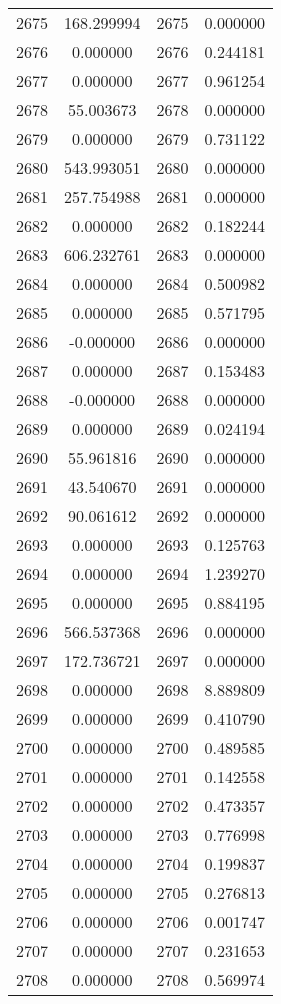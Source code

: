 \documentclass[12pt]{article}
\begin{document}
\begin{longtable}{@{}cccc@{}}
2675 & 168.299994 & 2675 & 0.000000 \\
2676 & 0.000000 & 2676 & 0.244181 \\
2677 & 0.000000 & 2677 & 0.961254 \\
2678 & 55.003673 & 2678 & 0.000000 \\
2679 & 0.000000 & 2679 & 0.731122 \\
2680 & 543.993051 & 2680 & 0.000000 \\
2681 & 257.754988 & 2681 & 0.000000 \\
2682 & 0.000000 & 2682 & 0.182244 \\
2683 & 606.232761 & 2683 & 0.000000 \\
2684 & 0.000000 & 2684 & 0.500982 \\
2685 & 0.000000 & 2685 & 0.571795 \\
2686 & -0.000000 & 2686 & 0.000000 \\
2687 & 0.000000 & 2687 & 0.153483 \\
2688 & -0.000000 & 2688 & 0.000000 \\
2689 & 0.000000 & 2689 & 0.024194 \\
2690 & 55.961816 & 2690 & 0.000000 \\
2691 & 43.540670 & 2691 & 0.000000 \\
2692 & 90.061612 & 2692 & 0.000000 \\
2693 & 0.000000 & 2693 & 0.125763 \\
2694 & 0.000000 & 2694 & 1.239270 \\
2695 & 0.000000 & 2695 & 0.884195 \\
2696 & 566.537368 & 2696 & 0.000000 \\
2697 & 172.736721 & 2697 & 0.000000 \\
2698 & 0.000000 & 2698 & 8.889809 \\
2699 & 0.000000 & 2699 & 0.410790 \\
2700 & 0.000000 & 2700 & 0.489585 \\
2701 & 0.000000 & 2701 & 0.142558 \\
2702 & 0.000000 & 2702 & 0.473357 \\
2703 & 0.000000 & 2703 & 0.776998 \\
2704 & 0.000000 & 2704 & 0.199837 \\
2705 & 0.000000 & 2705 & 0.276813 \\
2706 & 0.000000 & 2706 & 0.001747 \\
2707 & 0.000000 & 2707 & 0.231653 \\
2708 & 0.000000 & 2708 & 0.569974 \\

\end{longtable}
\end{document}
